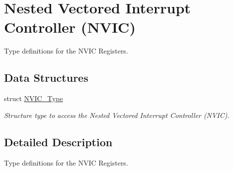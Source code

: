 \hypertarget{group___c_m_s_i_s___n_v_i_c}{\section{Nested Vectored Interrupt Controller (N\-V\-I\-C)}
\label{group___c_m_s_i_s___n_v_i_c}
}


Type definitions for the N\-V\-I\-C Registers.  


\subsection*{Data Structures}
\begin{DoxyCompactItemize}
\item 
struct \hyperlink{struct_n_v_i_c___type}{N\-V\-I\-C\-\_\-\-Type}
\begin{DoxyCompactList}\small\item\em Structure type to access the Nested Vectored Interrupt Controller (N\-V\-I\-C). \end{DoxyCompactList}\end{DoxyCompactItemize}


\subsection{Detailed Description}
Type definitions for the N\-V\-I\-C Registers. 